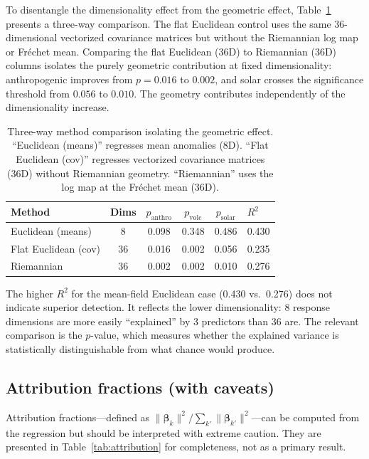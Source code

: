 \documentclass[preprint,12pt]{elsarticle}
\newcommand{\pval}{p}
\begin{document}
To disentangle the dimensionality effect from the geometric effect, Table~\ref{tab:threeway} presents a three-way comparison.
The flat Euclidean control uses the same 36-dimensional vectorized covariance matrices but without the Riemannian log map or Fr\'{e}chet mean.
Comparing the flat Euclidean (36D) to Riemannian (36D) columns isolates the purely geometric contribution at fixed dimensionality: anthropogenic improves from $\pval = 0.016$ to $0.002$, and solar crosses the significance threshold from $0.056$ to $0.010$.
The geometry contributes independently of the dimensionality increase.

\begin{table}[t]
\centering
\caption{Three-way method comparison isolating the geometric effect. ``Euclidean (means)'' regresses mean anomalies (8D). ``Flat Euclidean (cov)'' regresses vectorized covariance matrices (36D) without Riemannian geometry. ``Riemannian'' uses the log map at the Fr\'{e}chet mean (36D).}
\label{tab:threeway}
\begin{tabular}{lccccl}
\toprule
Method & Dims & $\pval_\mathrm{anthro}$ & $\pval_\mathrm{volc}$ & $\pval_\mathrm{solar}$ & $R^2$ \\
\midrule
Euclidean (means) & 8 & 0.098 & 0.348 & 0.486 & 0.430 \\
Flat Euclidean (cov) & 36 & 0.016 & 0.002 & 0.056 & 0.235 \\
Riemannian & 36 & 0.002 & 0.002 & 0.010 & 0.276 \\
\bottomrule
\end{tabular}
\end{table}

The higher $R^2$ for the mean-field Euclidean case (0.430 vs.\ 0.276) does not indicate superior detection.
It reflects the lower dimensionality: 8 response dimensions are more easily ``explained'' by 3 predictors than 36 are.
The relevant comparison is the $p$-value, which measures whether the explained variance is statistically distinguishable from what chance would produce.

\subsection{Attribution fractions (with caveats)}\label{sec:attribution}

Attribution fractions---defined as $\|\bm{\beta}_k\|^2 / \sum_{k'} \|\bm{\beta}_{k'}\|^2$---can be computed from the regression but should be interpreted with extreme caution.
They are presented in Table~\ref{tab:attribution} for completeness, not as a primary result.
\end{document}
